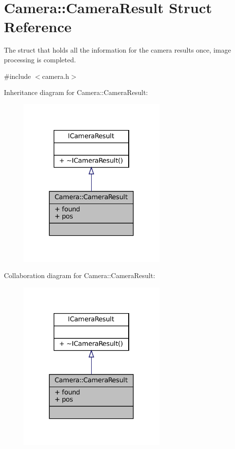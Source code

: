 \hypertarget{structCamera_1_1CameraResult}{}\section{Camera\+:\+:Camera\+Result Struct Reference}
\label{structCamera_1_1CameraResult}


The struct that holds all the information for the camera results once, image processing is completed.  




{\ttfamily \#include $<$camera.\+h$>$}



Inheritance diagram for Camera\+:\+:Camera\+Result\+:\nopagebreak
\begin{figure}[H]
\begin{center}
\leavevmode
\includegraphics[width=209pt]{structCamera_1_1CameraResult__inherit__graph}
\end{center}
\end{figure}


Collaboration diagram for Camera\+:\+:Camera\+Result\+:\nopagebreak
\begin{figure}[H]
\begin{center}
\leavevmode
\includegraphics[width=209pt]{structCamera_1_1CameraResult__coll__graph}
\end{center}
\end{figure}

